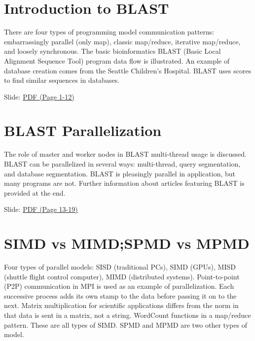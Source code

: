 \section{Introduction to BLAST}

There are four types of programming model communication patterns:
embarrassingly parallel (only map), classic map/reduce, iterative
map/reduce, and loosely synchronous. The basic bioinformatics BLAST
(Basic Local Alignment Sequence Tool) program data flow is illustrated.
An example of database creation comes from the Seattle Children's
Hospital. BLAST uses scores to find similar sequences in databases.


  Slide:
  \href{https://drive.google.com/open?id=0B88HKpainTSfdnFvY1V3dlFTRlE}{PDF
  (Page 1-12)}

\section{BLAST Parallelization}

The role of master and worker nodes in BLAST multi-thread usage is
discussed. BLAST can be parallelized in several ways: multi-thread,
query segmentation, and database segmentation. BLAST is pleasingly
parallel in application, but many programs are not. Further information
about articles featuring BLAST is provided at the end.


  Slide:
  \href{https://drive.google.com/open?id=0B88HKpainTSfdnFvY1V3dlFTRlE}{PDF
  (Page 13-19)}

\section{SIMD vs MIMD;SPMD vs MPMD}

Four types of parallel models: SISD (traditional PCs), SIMD (GPUs), MISD
(shuttle flight control computer), MIMD (distributed systems).
Point-to-point (P2P) communication in MPI is used as an example of
parallelization. Each successive process adds its own stamp to the data
before passing it on to the next. Matrix multiplication for scientific
applications differs from the norm in that data is sent in a matrix, not
a string. WordCount functions in a map/reduce pattern. These are all
types of SIMD. SPMD and MPMD are two other types of model.

